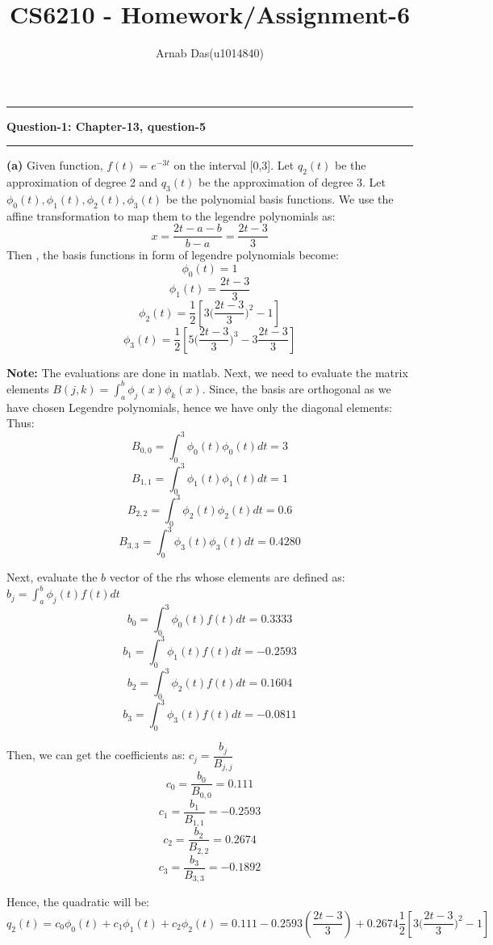 \documentclass{article}
\title{CS6210 - Homework/Assignment-6}
\author{Arnab Das(u1014840)}
\newcommand\question[2]{\vspace{.25in}\hrule\textbf{#1: #2}\hrule\vspace{.10in}}
\renewcommand\part[1]{\vspace{.10in}\textbf{(#1)}}
\begin{document}
  \maketitle
  \newpage
  \newcommand\NAME{ARNAB DAS}
  \newcommand\UID{uxxxxxxx}
  \newcommand\HWNUM{4}


  \question{Question-1}{Chapter-13, question-5}
  \part{a} Given function, $f(t) = e^{-3t}$ on the interval [0,3]. Let $q_2(t)$ be the approximation of degree 2 and $q_3(t)$ be the approximation of degree 3. \newline
  Let $\phi_0(t), \phi_1(t), \phi_2(t), \phi_3(t)$ be the polynomial basis functions.
  We use the affine transformation to map them to the legendre polynomials as:
  \[x = \dfrac{2t -a -b}{b-a} = \dfrac{2t - 3}{3}\]
  Then , the basis functions in form of legendre polynomials become:
  \[ \phi_0(t) = 1\]
  \[ \phi_1(t) = \dfrac{2t-3}{3}\]
  \[ \phi_2(t) = \dfrac{1}{2}[3\bigg (\dfrac{2t-3}{3}\bigg )^2 - 1]\]
  \[ \phi_3(t) = \dfrac{1}{2}[5\bigg (  \dfrac{2t-3}{3}\bigg )^3 - 3\dfrac{2t-3}{3}]\]

   \textbf{Note:} The evaluations are done in matlab. \newline
  Next, we need to evaluate the matrix elements $B(j,k) = \int_{a}^{b}\phi_j(x)\phi_k(x)$. Since, the basis are orthogonal as we have chosen Legendre polynomials, hence we have only the diagonal elements: Thus:
  \[ B_{0,0} = \int_{0}^{3} \phi_0(t)\phi_0(t) dt = 3 \]
  \[ B_{1,1} = \int_{0}^{3} \phi_1(t)\phi_1(t) dt = 1 \]
  \[ B_{2,2} = \int_{0}^{3} \phi_2(t)\phi_2(t) dt = 0.6 \]
  \[ B_{3,3} = \int_{0}^{3} \phi_3(t)\phi_3(t) dt = 0.4280 \]

  Next, evaluate the $b$ vector of the rhs whose elements are defined as: $b_j = \int_{a}^{b} \phi_j(t)f(t) dt$
  \[b_0 = \int_{0}^{3} \phi_0(t)f(t) dt = 0.3333\]
  \[b_1 = \int_{0}^{3} \phi_1(t)f(t) dt = -0.2593\]
  \[b_2 = \int_{0}^{3} \phi_2(t)f(t) dt = 0.1604\]
  \[b_3 = \int_{0}^{3} \phi_3(t)f(t) dt = -0.0811\]

  Then, we can get the coefficients as: $c_j = \dfrac{b_j}{B_{j,j}}$ 
  \[c_0 = \dfrac{b_0}{B_{0,0}} = 0.111\]
  \[c_1 = \dfrac{b_1}{B_{1,1}} = -0.2593\]
  \[c_2 = \dfrac{b_2}{B_{2,2}} = 0.2674\]
  \[c_3 = \dfrac{b_3}{B_{3,3}} = -0.1892\]

  Hence, the quadratic will be:
  \[q_2(t) = c_0\phi_0(t) + c_1\phi_1(t) + c_2\phi_2(t) = 0.111 - 0.2593(\dfrac{2t-3}{3}) + 0.2674\dfrac{1}{2}[3\bigg (\dfrac{2t-3}{3}\bigg )^2 - 1]\]
\end{document}
